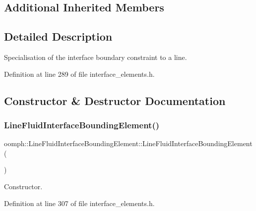 \subsection*{Additional Inherited Members}


\subsection{Detailed Description}
Specialisation of the interface boundary constraint to a line. 

Definition at line 289 of file interface\+\_\+elements.\+h.



\subsection{Constructor \& Destructor Documentation}
\mbox{\label{classoomph_1_1LineFluidInterfaceBoundingElement_a29d14ee44cd9b2db52779ea570850821}} 
\subsubsection{\texorpdfstring{Line\+Fluid\+Interface\+Bounding\+Element()}{LineFluidInterfaceBoundingElement()}}
{\footnotesize\ttfamily oomph\+::\+Line\+Fluid\+Interface\+Bounding\+Element\+::\+Line\+Fluid\+Interface\+Bounding\+Element (\begin{DoxyParamCaption}{ }\end{DoxyParamCaption})\hspace{0.3cm}{\ttfamily [inline]}}



Constructor. 



Definition at line 307 of file interface\+\_\+elements.\+h.



